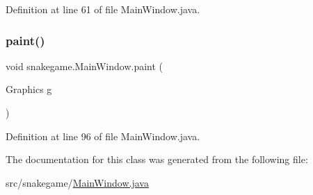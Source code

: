 Definition at line 61 of file Main\+Window.\+java.

\mbox{\label{classsnakegame_1_1_main_window_afe9dbd469853597ae9a61c56b85d2762}} 
\subsubsection{\texorpdfstring{paint()}{paint()}}
{\footnotesize\ttfamily void snakegame.\+Main\+Window.\+paint (\begin{DoxyParamCaption}\item[{Graphics}]{g }\end{DoxyParamCaption})}



Definition at line 96 of file Main\+Window.\+java.



The documentation for this class was generated from the following file\+:\begin{DoxyCompactItemize}
\item 
src/snakegame/\mbox{\hyperlink{_main_window_8java}{Main\+Window.\+java}}\end{DoxyCompactItemize}
